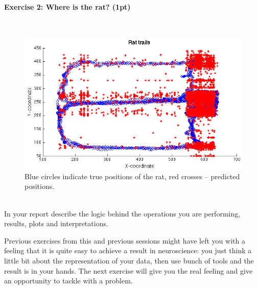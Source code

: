 \documentclass[a4paper,11pt]{article}
\newenvironment{exercise}[3]{\paragraph{Exercise #1: #2 (#3pt)}\ \\}{
\medskip}
\begin{document}
\begin{exercise}{2}{Where is the rat?}{1}
\begin{figure}[H]
   \centering
   \includegraphics[width=1\textwidth]{trails.png} 
   \caption{Blue circles indicate true positions of the rat, red crosses -- predicted positions.}
   \label{fig:mousetrail}
\end{figure}
\ \\
In your report describe the logic behind the operations you are performing, results, plots and interpretations.
\end{exercise}

Previous exercises from this and previous sessions might have left you with a feeling that it is quite easy to achieve a result in neuroscience: you just think a little bit about the representation of your data, then use bunch of tools and the result is in your hands. The next exercise will give you the real feeling and give an opportunity to tackle with a problem.
\end{document}
